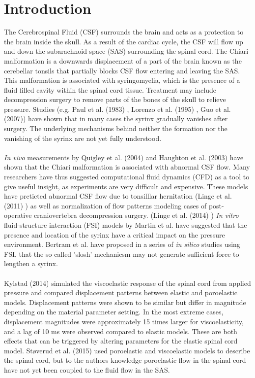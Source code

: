 \chapter{Introduction}
The Cerebrospinal Fluid (CSF) surrounds the brain and acts as a protection to the brain inside the skull. As a result of the cardiac cycle, the CSF will flow up and down the subarachnoid space (SAS) surrounding the spinal cord. The Chiari malformation is a downwards displacement of a part of the brain known as the cerebellar tonsils that partially blocks CSF flow entering and leaving the SAS. This malformation is associated with syringomyelia, which is the presence of a fluid filled cavity within the spinal cord tissue. Treatment may include decompression surgery to remove parts of the bones of the skull to relieve pressure. Studies (e.g. Paul et al. (1983) \cite{Paul83}, Lorenzo et al. (1995) \cite{Lore95}, Guo et al. (2007)\cite{Guo07}) have shown that in many cases the syrinx gradually vanishes after surgery. The underlying mechanisms behind neither the formation nor the vanishing of the syrinx are not yet fully understood. 
\\
\\
\textit{In vivo} measurements by Quigley et al. (2004) \cite{Quig04} and Haughton et al. (2003) \cite{Haug03} have shown that the Chiari malformation is associated with abnormal CSF flow. Many researchers have thus suggested computational fluid dynamics (CFD) as a tool to give useful insight, as experiments are very difficult and expensive. These models have preticted abnormal CSF flow due to tonsilllar hernitation (Linge et al. (2011) \cite{Ling11}) as well as normalization of flow patterns modeling cases of post-operative craniovertebra decompression surgery. (Linge et al. (2014) \cite{Ling14})
\textit{In vitro} fluid-structure interaction (FSI) models by Martin et al. \cite{Mart09IV} have suggested that the presence and location of the syrinx have a critical impact on the pressure environment. Bertram et al. \cite{Bert09} have proposed in a series of \textit{in silico} studies using FSI, that the so called 'slosh' mechanicsm may not generate sufficient force to lengthen a syrinx. 
\\
\\
Kylstad (2014) \cite{Kyls14} simulated the viscoelastic response of the spinal cord from applied pressure and compared displacement patterns between elastic and poroelastic models. Displacement patterns were shown to be similar but differ in magnitude depending on the material parameter setting. In the most extreme cases, displacement magnitudes were approximately 15 times larger for viscoelasticity, and a lag of 10 ms were observed compared to elastic models. These are both effects that can be triggered by altering parameters for the elastic spinal cord model. St{\o}verud et al. (2015) \cite{Stov15} used poroelastic and viscoelastic models to describe the spinal cord, but to the authors knowledge poroelastic flow in the spinal cord have not yet been coupled to the fluid flow in the SAS. 
